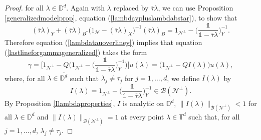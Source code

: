 \documentclass[11pt, reqno]{amsart}
\newcommand\1{\boldsymbol {1}}
\numberwithin{equation}{section}
\begin{document}
\begin{proof}
for all $\lambda\in\mathbb{D}^{d}$. Again with $\lambda$ replaced by $\overline{\tau}\lambda$, we can use Proposition \ref{generalizedmodelprop}, equation (\ref{lambdaypluslambdabstar}), to show that 
\begin{equation}\label{lambdatauoverliney}
(\overline{\tau}\lambda)_{Y}+(\overline{\tau}\lambda)_{B^{*}}\big(1_{\mathcal{N}}-(\overline{\tau}\lambda)_{X}\big)^{-1}(\overline{\tau}\lambda)_{B} = 1_{\mathcal{N}^{\perp}}-\bigg(\dfrac{\mathds{1}}{\mathds{1}-\overline{\tau}\lambda}\bigg)_{Y}^{-1}.
\end{equation}
Therefore equation (\ref{lambdatauoverliney}) implies that equation (\ref{lastlineforgammageneralized}) takes the form
\begin{equation}\label{gammaequals1-qIu}
\gamma = \bigg[1_{\mathcal{N}^{\perp}}-Q\Big(1_{\mathcal{N}^{\perp}}-\Big(\dfrac{\mathds{1}}{\mathds{1}-\overline{\tau}\lambda}\Big)^{-1}_{Y}\Big)\bigg]u(\lambda) = \big(1_{\mathcal{N}^{\perp}}-QI(\lambda)\big)u(\lambda),
\end{equation}
where, for all $\lambda\in\overline{\mathbb{D}^{d}}$ such that $\lambda_{j}\neq \tau_{j}$ for $j=1,\hdots,d$, we define $I(\lambda)$ by
\begin{equation}\label{Ilambdaoperatorgeneralized}
I(\lambda) =1_{\mathcal{N}^{\perp}}-\bigg(\dfrac{\mathds{1}}{\mathds{1}-\overline{\tau}\lambda}\bigg)^{-1}_{Y}\in\mathcal{B(N^{\perp})}.
\end{equation}
By Proposition \ref{Ilambdaproperties}, $I$ is analytic on $\mathbb{D}^{d}$, $\|I(\lambda)\|_{\mathcal{B(\mathcal{N}^{\perp})}}<1$ for all $\lambda\in\mathbb{D}^{d}$ and $\|I(\lambda)\|_{\mathcal{B(\mathcal{N}^{\perp})}}=1$ at every point $\lambda\in\mathbb{T}^{d}$ such that, for all $j=1,\hdots,d$, $\lambda_{j}\neq\tau_{j}$.


\end{proof}
\end{document}
